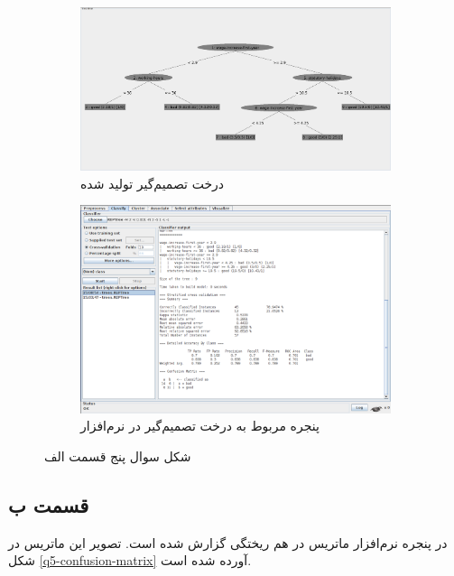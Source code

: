 \documentclass{article}
\begin{document}
\begin{figure}[h]
    \begin{subfigure}{0.48\linewidth}
        \includegraphics[width=\linewidth]{images/q5/tree_visualization.png}
        \caption{درخت تصمیم‌گیر تولید شده}
    \end{subfigure}
    \hfill
    \begin{subfigure}{0.48\linewidth}
        \includegraphics[width=\linewidth]{images/q5/weka_tree_generator.png}
        \caption{پنجره مربوط به درخت تصمیم‌گیر در نرم‌افزار }
    \end{subfigure}
    \caption{شکل سوال پنج قسمت الف}
    \label{question5-parta}
\end{figure}

\subsection*{قسمت ب}

در پنجره نرم‌افزار ماتریس در هم ریختگی گزارش شده است. تصویر این ماتریس در شکل
\ref{q5-confusion-matrix} آورده شده است.
\end{document}
